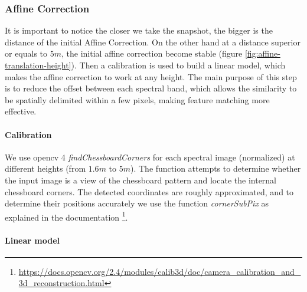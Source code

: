 \documentclass[]{elsarticle}
\begin{document}
	
	\subsubsection{Affine Correction}
	\label{sec:affine}
	
	It is important to notice the closer we take the snapshot, the bigger is the distance of the initial Affine Correction.
	On the other hand at a distance superior or equals to $5m$, the initial affine correction become stable (figure \ref{fig:affine-translation-height}).
	Then a calibration is used to build a linear model, which makes the affine correction to work at any height.
	The main purpose of this step is to reduce the offset between each spectral band,
	which allows the similarity to be spatially delimited within a few pixels, making feature matching more effective.
	
	\paragraph{Calibration}
	We use opencv 4 \textit{findChessboardCorners} for each spectral image (normalized) at different heights (from $1.6m$ to $5m$).
	The function attempts to determine whether the input image is a view of the chessboard pattern and locate the internal chessboard corners.
	The detected coordinates are roughly approximated, and to determine their positions accurately we use the function \textit{cornerSubPix}  as explained in the documentation \footnote{\url{https://docs.opencv.org/2.4/modules/calib3d/doc/camera_calibration_and_3d_reconstruction.html}}.
	
	\paragraph{Linear model}
	
\end{document}
